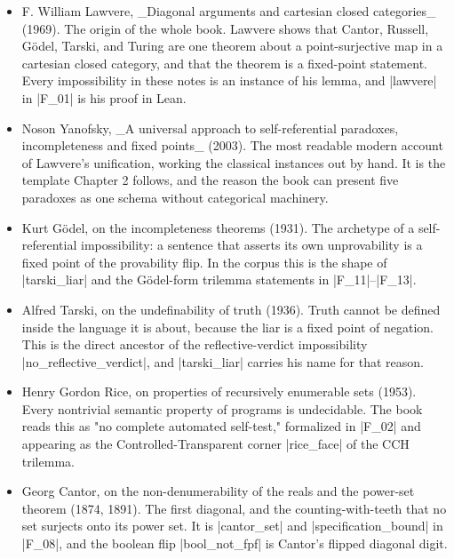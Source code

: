 \documentclass{memoir}
\begin{document}
\begin{itemize}
\item F. William Lawvere, \_Diagonal arguments and cartesian closed categories\_
   (1969). The origin of the whole book. Lawvere shows that Cantor, Russell, Gödel,
   Tarski, and Turing are one theorem about a point-surjective map in a cartesian
   closed category, and that the theorem is a fixed-point statement. Every
   impossibility in these notes is an instance of his lemma, and \LeanVerb|lawvere| in \LeanVerb|F_01|
   is his proof in Lean.
\item Noson Yanofsky, \_A universal approach to self-referential paradoxes,
   incompleteness and fixed points\_ (2003). The most readable modern account of
   Lawvere's unification, working the classical instances out by hand. It is the
   template Chapter 2 follows, and the reason the book can present five paradoxes as
   one schema without categorical machinery.
\item Kurt Gödel, on the incompleteness theorems (1931). The archetype of a
   self-referential impossibility: a sentence that asserts its own unprovability is
   a fixed point of the provability flip. In the corpus this is the shape of
   \LeanVerb|tarski_liar| and the Gödel-form trilemma statements in \LeanVerb|F_11|–\LeanVerb|F_13|.
\item Alfred Tarski, on the undefinability of truth (1936). Truth cannot be defined
   inside the language it is about, because the liar is a fixed point of negation.
   This is the direct ancestor of the reflective-verdict impossibility
   \LeanVerb|no_reflective_verdict|, and \LeanVerb|tarski_liar| carries his name for that reason.
\item Henry Gordon Rice, on properties of recursively enumerable sets (1953). Every
   nontrivial semantic property of programs is undecidable. The book reads this as
   "no complete automated self-test," formalized in \LeanVerb|F_02| and appearing as the
   Controlled-Transparent corner \LeanVerb|rice_face| of the CCH trilemma.
\item Georg Cantor, on the non-denumerability of the reals and the power-set theorem
   (1874, 1891). The first diagonal, and the counting-with-teeth that no set
   surjects onto its power set. It is \LeanVerb|cantor_set| and \LeanVerb|specification_bound| in
   \LeanVerb|F_08|, and the boolean flip \LeanVerb|bool_not_fpf| is Cantor's flipped diagonal digit.

\end{itemize}
\end{document}
